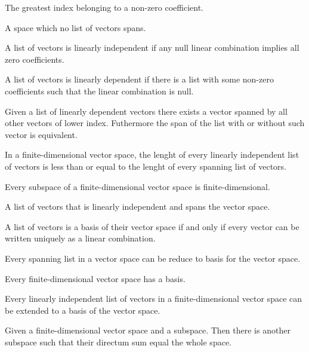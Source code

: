\begin{multicols}{3}
  The greatest index belonging to a non-zero coefficient.
  
  A space which no list of vectors spans.
  
  A list of vectors is linearly independent if any null linear combination implies all zero coefficients.
  
  A list of vectors is linearly dependent if there is a list with some non-zero coefficients such that the linear combination is null.
  
  Given a list of linearly dependent vectors there exists a vector spanned by all other vectors of lower index. Futhermore the span of the list with or without such vector is equivalent.
  
  In a finite-dimensional vector space, the lenght of every linearly independent list of vectors is less than or equal to the lenght of every spanning list of vectors.
  
  Every subspace of a finite-dimensional vector space is finite-dimensional.
  
  A list of vectors that is linearly independent and spans the vector space.
  
  A list of vectors is a basis of their vector space if and only if every vector can be written uniquely as a linear combination.
  
  Every spanning list in a vector space can be reduce to basis for the vector space.
  
  Every finite-dimensional vector space has a basis.
  
  Every linearly independent list of vectors in a finite-dimensional vector space can be extended to a basis of the vector space.
  
  Given a finite-dimensional vector space and a subspace. Then there is another subspace such that their directum sum equal the whole space.
  

\end{multicols}
